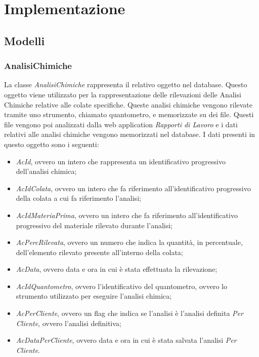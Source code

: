\chapter{Implementazione}
  \label{chapter_implementazione}
  \section{Modelli}

  \subsection{AnalisiChimiche}
  La classe \textit{AnalisiChimiche} rappresenta il relativo oggetto nel database. Questo oggetto viene utilizzato per la
  rappresentazione delle rilevazioni delle Analisi Chimiche relative alle colate specifiche. Queste analisi chimiche vengono
  rilevate tramite uno strumento, chiamato quantometro, e memorizzate su dei file. Questi file vengono poi analizzati dalla
  web application \textit{Rapporti di Lavoro} e i dati relativi alle analisi chimiche vengono memorizzati nel database. I dati
  presenti in questo oggetto sono i seguenti:
  \begin{itemize}
    \item \textit{AcId}, ovvero un intero che rappresenta un identificativo progressivo dell'analisi chimica;
    \item \textit{AcIdColata}, ovvero un intero che fa riferimento all'identificativo progressivo della colata a cui
    fa riferimento l'analisi;
    \item \textit{AcIdMateriaPrima}, ovvero un intero che fa riferimento all'identificativo progressivo del materiale rilevato durante
    l'analisi;
    \item \textit{AcPercRilevata}, ovvero un numero che indica la quantità, in percentuale, dell'elemento rilevato presente
    all'interno della colata;
    \item \textit{AcData}, ovvero data e ora in cui è stata effettuata la rilevazione;
    \item \textit{AcIdQuantometro}, ovvero l'identificativo del quantometro, ovvero lo strumento utilizzato per eseguire
    l'analisi chimica;
    \item \textit{AcPerCliente}, ovvero un flag che indica se l'analisi è l'analisi definita \textit{Per Cliente},
    ovvero l'analisi definitiva;
    \item \textit{AcDataPerCliente}, ovvero data e ora in cui è stata salvata l'analisi \textit{Per Cliente}.
  \end{itemize}

